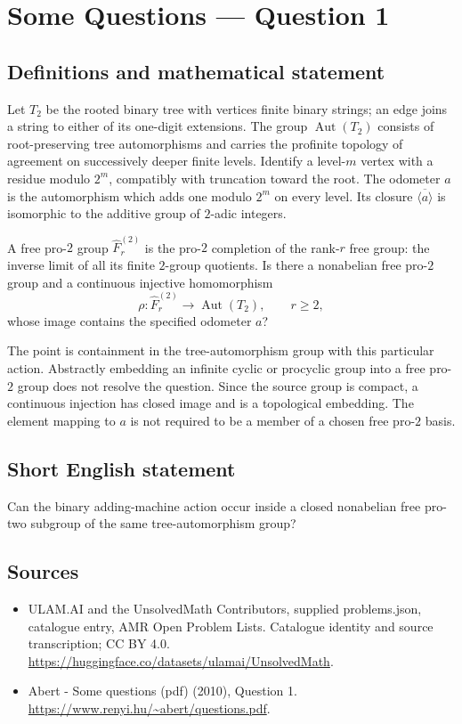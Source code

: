 \documentclass[11pt,a4paper]{article}
\begin{document}
\section*{Some Questions — Question 1}\label{statement}

\subsection{Definitions and mathematical statement}
Let $T_2$ be the rooted binary tree with vertices finite binary strings; an edge joins a string to either of its one-digit extensions. The group $\operatorname{Aut}(T_2)$ consists of root-preserving tree automorphisms and carries the profinite topology of agreement on successively deeper finite levels. Identify a level-$m$ vertex with a residue modulo $2^m$, compatibly with truncation toward the root. The odometer $a$ is the automorphism which adds one modulo $2^m$ on every level. Its closure $\overline{\langle a\rangle}$ is isomorphic to the additive group of $2$-adic integers.

A free pro-$2$ group $\widehat F^{(2)}_r$ is the pro-$2$ completion of the rank-$r$ free group: the inverse limit of all its finite $2$-group quotients. Is there a nonabelian free pro-$2$ group and a continuous injective homomorphism
\[
 \rho:\widehat F^{(2)}_r\longrightarrow\operatorname{Aut}(T_2),
 \qquad r\geq2,
\]
whose image contains the specified odometer $a$?

The point is containment in the tree-automorphism group with this particular action. Abstractly embedding an infinite cyclic or procyclic group into a free pro-$2$ group does not resolve the question. Since the source group is compact, a continuous injection has closed image and is a topological embedding. The element mapping to $a$ is not required to be a member of a chosen free pro-$2$ basis.
\subsection{Short English statement}
Can the binary adding-machine action occur inside a closed nonabelian free pro-two subgroup of the same tree-automorphism group?
\subsection{Sources}
\begin{itemize}
\item[S1] ULAM.AI and the UnsolvedMath Contributors, supplied problems.json, catalogue entry, AMR Open Problem Lists. Catalogue identity and source transcription; CC BY 4.0.
\url{https://huggingface.co/datasets/ulamai/UnsolvedMath}.
\item[S2] Abert - Some questions (pdf) (2010), Question 1. 
\url{https://www.renyi.hu/~abert/questions.pdf}.
\end{itemize}
\end{document}
